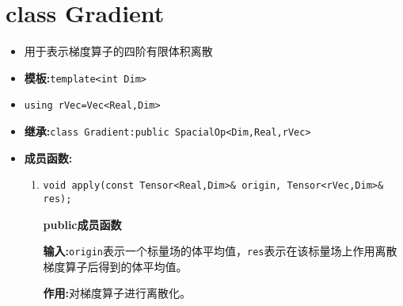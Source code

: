 \documentclass[UTF8]{ctexart}
\theoremstyle{plain}
\theoremstyle{definition}
\theoremstyle{remark}
\begin{document}
\section{class Gradient}
\begin{itemize}
    \item 用于表示梯度算子的四阶有限体积离散
    \item \textbf{模板:}\texttt{template<int Dim>}
    \item \texttt{using rVec=Vec<Real,Dim>}
    \item \textbf{继承:}\texttt{class Gradient:public SpacialOp<Dim,Real,rVec>}
    \item \textbf{成员函数:}
    \begin{enumerate}
        \item \texttt{void apply(const Tensor<Real,Dim>\& origin, Tensor<rVec,Dim>\& res);}
        
        \textbf{public成员函数}

        \textbf{输入:}\texttt{origin}表示一个标量场的体平均值，\texttt{res}表示在该标量场上作用离散梯度算子后得到的体平均值。

        \textbf{作用:}对梯度算子进行离散化。
    \end{enumerate}
\end{itemize}
\end{document}
